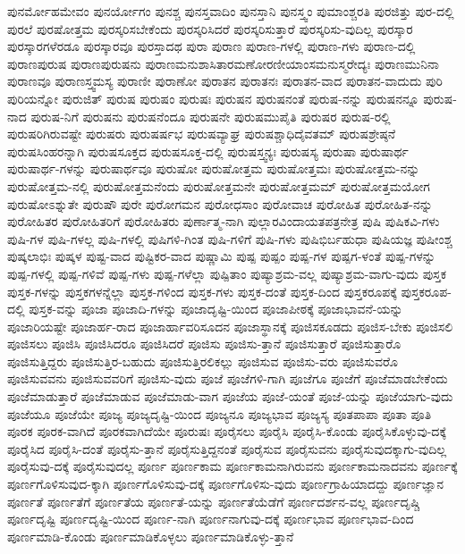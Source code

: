 {ಪುನರ್ಮೋಹಮೇವಂ
ಪುನರ್ಯೋಗಂ
ಪುನಶ್ಚ
ಪುನಸ್ತವಾದಿಂ
ಪುನಸ್ತಾನಿ
ಪುನಸ್ತ್ವಂ
ಪುಮಾಂಶ್ಚರತಿ
ಪುರಜಿತ್ತು
ಪುರ-ದಲ್ಲಿ
ಪುರಲೆ
ಪುರಷೋತ್ತಮ
ಪುರಸ್ಕರಿಸಬೇಕೆಂದು
ಪುರಸ್ಕರಿಸಿದರೆ
ಪುರಸ್ಕರಿಸುತ್ತಾರೆ
ಪುರಸ್ಕರಿಸು-ವುದಿಲ್ಲ
ಪುರಸ್ಕಾರ
ಪುರಸ್ಕಾರಗಳೆರಡೂ
ಪುರಸ್ಕಾರವೂ
ಪುರಸ್ತಾದಥ
ಪುರಾ
ಪುರಾಣ
ಪುರಾಣ-ಗಳಲ್ಲಿ
ಪುರಾಣ-ಗಳು
ಪುರಾಣ-ದಲ್ಲಿ
ಪುರಾಣಪುರುಷ
ಪುರಾಣಪುರುಷನು
ಪುರಾಣಮನುಶಾಸಿತಾರಮಣೋರಣೀಯಾಂಸಮನುಸ್ಮರೇದ್ಯಃ
ಪುರಾಣಮುನಿನಾ
ಪುರಾಣವೂ
ಪುರಾಣಸ್ತ್ವಮಸ್ಯ
ಪುರಾಣೀ
ಪುರಾಣೋ
ಪುರಾತನ
ಪುರಾತನಃ
ಪುರಾತನ-ವಾದ
ಪುರಾತನ-ವಾದುದು
ಪುರಿ
ಪುರಿಯನ್ನೋ
ಪುರುಜಿತ್
ಪುರುಷ
ಪುರುಷಂ
ಪುರುಷಃ
ಪುರುಷನ
ಪುರುಷನಂತೆ
ಪುರುಷ-ನನ್ನು
ಪುರುಷನನ್ನೂ
ಪುರುಷ-ನಾದ
ಪುರುಷ-ನಿಗೆ
ಪುರುಷನು
ಪುರುಷನೆಂದೂ
ಪುರುಷನೇ
ಪುರುಷಮುಪೈತಿ
ಪುರುಷರ
ಪುರುಷ-ರಲ್ಲಿ
ಪುರುಷರಿಗಿರುವಷ್ಟೇ
ಪುರುಷರು
ಪುರುಷರ್ಷಭ
ಪುರುಷವ್ಯಾಘ್ರ
ಪುರುಷಶ್ಚಾಧಿದೈವತಮ್
ಪುರುಷಶ್ರೇಷ್ಠನೆ
ಪುರುಷಸಿಂಹರನ್ನಾಗಿ
ಪುರುಷಸೂಕ್ತದ
ಪುರುಷಸೂಕ್ತ-ದಲ್ಲಿ
ಪುರುಷಸ್ತ್ವನ್ಯಃ
ಪುರುಷಸ್ಯ
ಪುರುಷಾ
ಪುರುಷಾರ್ಥ
ಪುರುಷಾರ್ಥ-ಗಳನ್ನು
ಪುರುಷಾರ್ಥವೂ
ಪುರುಷೋ
ಪುರುಷೋತ್ತಮ
ಪುರುಷೋತ್ತಮಃ
ಪುರುಷೋತ್ತಮ-ನನ್ನು
ಪುರುಷೋತ್ತಮ-ನಲ್ಲಿ
ಪುರುಷೋತ್ತಮನೆಂದು
ಪುರುಷೋತ್ತಮನೇ
ಪುರುಷೋತ್ತಮಮ್
ಪುರುಷೋತ್ತಮಯೋಗ
ಪುರುಷೋಽಶ್ನುತೇ
ಪುರುಷೌ
ಪುರೇ
ಪುರೋಗಮನ
ಪುರೋಧಸಾಂ
ಪುರೋವಾಚ
ಪುರೋಹಿತ
ಪುರೋಹಿತ-ನನ್ನು
ಪುರೋಹಿತರ
ಪುರೋಹಿತರಿಗೆ
ಪುರೋಹಿತರು
ಪುರ್ಣಾತ್ಮ-ನಾಗಿ
ಪುಲ್ಲಾರವಿಂದಾಯತಪತ್ರನೇತ್ರ
ಪುಷಿ
ಪುಷಿಕವಿ-ಗಳು
ಪುಷಿ-ಗಳ
ಪುಷಿ-ಗಳಲ್ಲ
ಪುಷಿ-ಗಳಲ್ಲಿ
ಪುಷಿಗಳಿ-ಗಿಂತ
ಪುಷಿ-ಗಳಿಗೆ
ಪುಷಿ-ಗಳು
ಪುಷಿಭಿರ್ಬಹುಧಾ
ಪುಷಿಯಜ್ಞ
ಪುಷೀಂಶ್ಚ
ಪುಷ್ಕಲಾಭಿಃ
ಪುಷ್ಕಳ
ಪುಷ್ಟ-ವಾದ
ಪುಷ್ಟಿಕರ-ವಾದ
ಪುಷ್ಣಾಮಿ
ಪುಷ್ಪ
ಪುಷ್ಪಂ
ಪುಷ್ಪ-ಗಳ
ಪುಷ್ಪಗ-ಳಂತೆ
ಪುಷ್ಪ-ಗಳನ್ನು
ಪುಷ್ಪ-ಗಳಲ್ಲಿ
ಪುಷ್ಪ-ಗಳಿವೆ
ಪುಷ್ಪ-ಗಳು
ಪುಷ್ಪ-ಗಳೆಲ್ಲಾ
ಪುಷ್ಪಿತಾಂ
ಪುಷ್ಯಾಶ್ರಮ-ವಲ್ಲ
ಪುಷ್ಯಾಶ್ರಮ-ವಾಗು-ವುದು
ಪುಸ್ತಕ
ಪುಸ್ತಕ-ಗಳನ್ನು
ಪುಸ್ತಕಗಳನ್ನೆಲ್ಲಾ
ಪುಸ್ತಕ-ಗಳಿಂದ
ಪುಸ್ತಕ-ಗಳು
ಪುಸ್ತಕ-ದಂತೆ
ಪುಸ್ತಕ-ದಿಂದ
ಪುಸ್ತಕರೂಪಕ್ಕೆ
ಪುಸ್ತಕರೂಪ-ದಲ್ಲಿ
ಪುಸ್ತಕ-ವನ್ನು
ಪೂಜಾ
ಪೂಜಾದಿ-ಗಳನ್ನು
ಪೂಜಾದೃಷ್ಟಿ-ಯಿಂದ
ಪೂಜಾಪೀಠಕ್ಕೆ
ಪೂಜಾಭಾವನೆ-ಯನ್ನು
ಪೂಜಾರಿಯಷ್ಟೇ
ಪೂಜಾರ್ಹ-ರಾದ
ಪೂಜಾರ್ಹಾವರಿಸೂದನ
ಪೂಜಾಸ್ಥಾನಕ್ಕೆ
ಪೂಜಿಸಕೂಡದು
ಪೂಜಿಸ-ಬೇಕು
ಪೂಜಿಸಲಿ
ಪೂಜಿಸಲು
ಪೂಜಿಸಿ
ಪೂಜಿಸಿದರೂ
ಪೂಜಿಸಿದರೆ
ಪೂಜಿಸು
ಪೂಜಿಸು-ತ್ತಾನೆ
ಪೂಜಿಸುತ್ತಾರೆ
ಪೂಜಿಸುತ್ತಾರೊ
ಪೂಜಿಸುತ್ತಿದ್ದರು
ಪೂಜಿಸುತ್ತಿರ-ಬಹುದು
ಪೂಜಿಸುತ್ತಿರಲಿಕಲ್ಲು
ಪೂಜಿಸುವ
ಪೂಜಿಸು-ವರು
ಪೂಜಿಸುವರೊ
ಪೂಜಿಸುವವನು
ಪೂಜಿಸುವವರಿಗೆ
ಪೂಜಿಸು-ವುದು
ಪೂಜೆ
ಪೂಜೆಗಳಿ-ಗಾಗಿ
ಪೂಜೆಗೂ
ಪೂಜೆಗೆ
ಪೂಜೆಮಾಡಬೇಕೆಂದು
ಪೂಜೆಮಾಡುತ್ತಾರೆ
ಪೂಜೆಮಾಡುವ
ಪೂಜೆಮಾಡು-ವಾಗ
ಪೂಜೆಯ
ಪೂಜೆ-ಯಂತೆ
ಪೂಜೆ-ಯನ್ನು
ಪೂಜೆಯಾಗು-ವುದು
ಪೂಜೆಯೂ
ಪೂಜೆಯೇ
ಪೂಜ್ಯ
ಪೂಜ್ಯದೃಷ್ಟಿ-ಯಿಂದ
ಪೂಜ್ಯನೂ
ಪೂಜ್ಯಭಾವ
ಪೂಜ್ಯಸ್ಯ
ಪೂತಪಾಪಾ
ಪೂತಾ
ಪೂತಿ
ಪೂರಕ
ಪೂರಕ-ವಾಗಿದೆ
ಪೂರಕವಾಗಿದೆಯೇ
ಪೂರುಷಃ
ಪೂರೈಸಲು
ಪೂರೈಸಿ
ಪೂರೈಸಿ-ಕೊಂಡು
ಪೂರೈಸಿಕೊಳ್ಳುವು-ದಕ್ಕೆ
ಪೂರೈಸಿದ
ಪೂರೈಸಿ-ದಂತೆ
ಪೂರೈಸು-ತ್ತಾನೆ
ಪೂರೈಸುತ್ತಿದ್ದನಂತೆ
ಪೂರೈಸುವ
ಪೂರೈಸುವನು
ಪೂರೈಸುವುದಕ್ಕಾಗು-ವುದಿಲ್ಲ
ಪೂರೈಸುವು-ದಕ್ಕೆ
ಪೂರೈಸುವುದಲ್ಲ
ಪೂರ್ಣ
ಪೂರ್ಣಕಾಮ
ಪೂರ್ಣಕಾಮನಾಗಿರುವನು
ಪೂರ್ಣಕಾಮನಾದವನು
ಪೂರ್ಣಕ್ಕೆ
ಪೂರ್ಣಗೊಳಿಸುವುದ-ಕ್ಕಾಗಿ
ಪೂರ್ಣಗೊಳಿಸುವು-ದಕ್ಕೆ
ಪೂರ್ಣಗೊಳಿಸು-ವುದು
ಪೂರ್ಣಗ್ರಾಹಿಯಾದದ್ದು
ಪೂರ್ಣಜ್ಞಾನ
ಪೂರ್ಣತೆ
ಪೂರ್ಣತೆಗೆ
ಪೂರ್ಣತೆಯ
ಪೂರ್ಣತೆ-ಯನ್ನು
ಪೂರ್ಣತೆಯೆಡೆಗೆ
ಪೂರ್ಣದರ್ಶನ-ವಲ್ಲ
ಪೂರ್ಣದೃಷ್ಚಿ
ಪೂರ್ಣದೃಷ್ಟಿ
ಪೂರ್ಣದೃಷ್ಟಿ-ಯಿಂದ
ಪೂರ್ಣ-ನಾಗಿ
ಪೂರ್ಣನಾಗುವು-ದಕ್ಕೆ
ಪೂರ್ಣಭಾವ
ಪೂರ್ಣಭಾವ-ದಿಂದ
ಪೂರ್ಣಮಾಡಿ-ಕೊಂಡು
ಪೂರ್ಣಮಾಡಿಕೊಳ್ಳಲು
ಪೂರ್ಣಮಾಡಿಕೊಳ್ಳು-ತ್ತಾನೆ
}
